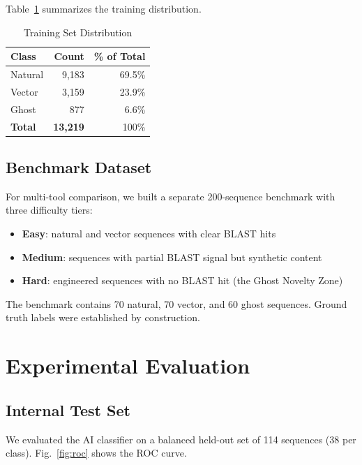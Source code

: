 \documentclass[conference]{IEEEtran}
\begin{document}
Table~\ref{tab:data} summarizes the training distribution.

\begin{table}[h]
\centering
\caption{Training Set Distribution}
\label{tab:data}
\begin{tabular}{lrr}
\toprule
Class & Count & \% of Total \\
\midrule
Natural & 9,183 & 69.5\% \\
Vector  & 3,159 & 23.9\% \\
Ghost   & 877   & 6.6\%  \\
\midrule
\textbf{Total} & \textbf{13,219} & 100\% \\
\bottomrule
\end{tabular}
\end{table}

\subsection{Benchmark Dataset}

For multi-tool comparison, we built a separate 200-sequence benchmark with three difficulty tiers:

\begin{itemize}
    \item \textbf{Easy}: natural and vector sequences with clear BLAST hits
    \item \textbf{Medium}: sequences with partial BLAST signal but synthetic content
    \item \textbf{Hard}: engineered sequences with no BLAST hit (the Ghost Novelty Zone)
\end{itemize}

The benchmark contains 70 natural, 70 vector, and 60 ghost sequences. Ground truth labels were established by construction.

\section{Experimental Evaluation}
\label{sec:eval}

\subsection{Internal Test Set}

We evaluated the AI classifier on a balanced held-out set of 114 sequences (38 per class). Fig.~\ref{fig:roc} shows the ROC curve.
\end{document}

